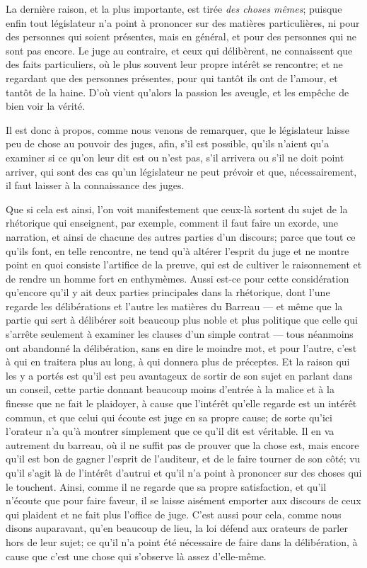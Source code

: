 La dernière raison, et la plus importante, est tirée \emph{des choses mêmes}; puisque enfin tout législateur n'a point à prononcer sur des
matières particulières, ni pour des personnes qui soient présentes, mais en général, et pour des personnes qui ne sont pas encore. Le juge
au contraire, et ceux qui délibèrent, ne connaissent que des faits  particuliers, où le plus souvent leur propre intérêt se rencontre; et ne
regardant que des personnes présentes, pour qui tantôt ils ont de l'amour, et tantôt de la haine. D'où vient qu'alors la passion les
aveugle, et les empêche de bien voir la vérité. 

Il est donc à propos, comme nous venons de remarquer, que le législateur laisse peu de chose au pouvoir des juges, afin, s'il est possible,
qu'ils n'aient qu'a examiner si ce qu'on leur dit est ou n'est pas, s'il arrivera ou s'il ne doit point arriver, qui sont des cas qu'un
législateur ne peut prévoir et que, nécessairement, il faut laisser à la connaissance des juges. 

\bigbreak

Que si cela est ainsi, l'on voit manifestement que ceux-là sortent du sujet de la rhétorique qui enseignent, par exemple, comment il faut
faire un exorde, une narration, et ainsi de chacune des autres parties d'un discours; parce que tout ce qu'ils font, en telle rencontre, ne
tend qu'à altérer l'esprit du juge et ne montre point en quoi consiste l'artifice de la preuve, qui est de cultiver le raisonnement et
de rendre un homme fort en enthymèmes. Aussi est-ce pour cette considération qu'encore qu'il y ait deux parties principales dans la rhétorique,
dont l'une regarde les délibérations et l'autre les matières du Barreau --- et même que la partie qui sert à délibérer soit beaucoup plus noble
et plus politique que celle qui s'arrête seulement à examiner les clauses d'un simple contrat --- tous néanmoins ont abandonné la délibération,
sans en dire le moindre mot, et pour l'autre, c'est à qui en traitera plus au  long, à qui donnera plus de préceptes. Et la raison qui les
y a portés est qu'il est peu avantageux de sortir de son sujet en parlant dans un conseil, cette partie donnant beaucoup moins d'entrée à la
malice et à la finesse que ne fait le plaidoyer, à cause que l'intérêt qu'elle regarde est un intérêt commun, et que celui qui écoute est juge
en sa propre cause; de sorte qu'ici l'orateur n'a qu'à montrer simplement que ce qu'il dit est véritable. Il en va autrement du barreau, où il ne
suffit pas de prouver que la chose est, mais encore  qu'il est bon de gagner l'esprit de l'auditeur, et de le faire tourner de son côté; vu qu'il
s'agit là de l'intérêt d'autrui et qu'il n'a point à prononcer sur des choses qui le touchent. Ainsi, comme il ne regarde que sa propre
satisfaction, et qu'il n'écoute que pour faire faveur, il se laisse aisément emporter aux discours de ceux qui plaident et ne fait plus l'office
de juge. C'est aussi pour cela, comme nous disons auparavant, qu'en beaucoup de lieu, la loi défend aux orateurs de parler hors de leur sujet; ce
qu'il n'a point été nécessaire de faire dans la délibération, à cause que c'est une chose qui s'observe là assez d'elle-même.

